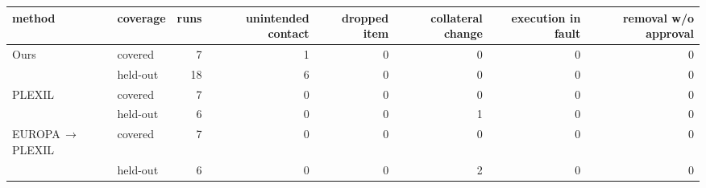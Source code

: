 \begin{tabular}{llrrrrrr}
\toprule
method & coverage & runs & unintended contact & dropped item & collateral change & execution in fault & removal w/o approval \\
\midrule
Ours & covered & 7 & 1 & 0 & 0 & 0 & 0 \\
 & held-out & 18 & 6 & 0 & 0 & 0 & 0 \\
PLEXIL & covered & 7 & 0 & 0 & 0 & 0 & 0 \\
 & held-out & 6 & 0 & 0 & 1 & 0 & 0 \\
EUROPA\,$\rightarrow$\,PLEXIL & covered & 7 & 0 & 0 & 0 & 0 & 0 \\
 & held-out & 6 & 0 & 0 & 2 & 0 & 0 \\
\bottomrule
\end{tabular}
